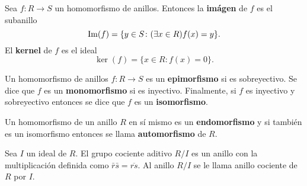 \begin{definicion}
Sea $f \colon R \to S$ un homomorfismo de anillos. Entonces la \textbf{imágen} de $f$ es el subanillo \[\operatorname{Im} (f) = \{ y \in S \colon (\exists x \in R) f(x)=y \}. \]
El \textbf{kernel} de $f$ es el ideal\[ \ker(f) = \{ x \in R \colon f(x) = 0 \}. \]
\end{definicion}
\begin{definicion}
Un homomorfismo de anillos $f \colon R \to S$ es un \textbf{epimorfismo} si es sobreyectivo. Se dice que $f$ es un \textbf{monomorfismo} si es inyectivo. Finalmente, si $f$ es inyectivo y sobreyectivo entonces se dice que $f$ es un \textbf{isomorfismo}.
\end{definicion}
Un homomorfismo de un anillo $R$ en sí mismo es un \textbf{endomorfismo} y si también es un isomorfismo entonces se llama \textbf{automorfismo} de $R$.
\begin{definicion}
Sea $I$ un ideal de $R$. El grupo cociente aditivo $R/I$ es un anillo con la multiplicación definida como $\bar{r}\bar{s} = \overline{rs}$. Al anillo $R/I$ se le llama anillo cociente de $R$ por $I$. 
\end{definicion}


